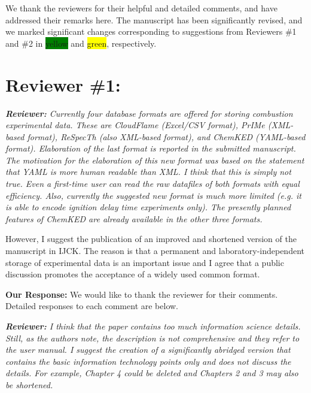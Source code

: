 \documentclass[a4paper,10pt]{elsarticle}
\providecommand{\hly}[1]{\colorbox{yellow}{#1}}
\providecommand{\hlg}[1]{\colorbox{green}{#1}}
\newenvironment{reviewer}{\vspace{0.5\baselineskip}\begingroup\itshape\textbf{Reviewer:}}{\endgroup}
\newenvironment{response}{\textbf{Our Response:}}{\vspace{0.5\baselineskip}}
\begin{document}
We thank the reviewers for their helpful and detailed comments, and have addressed their remarks here.
The manuscript has been significantly revised, and we marked significant changes corresponding to suggestions from Reviewers \#1 and \#2 in \hlg{yellow} and \hly{green}, respectively.


\section*{Reviewer \#1:}

\begin{reviewer}
    Currently four database formats are offered for storing combustion experimental data. These are
    CloudFlame (Excel/CSV format), PrIMe (XML-based format), ReSpecTh (also XML-based format), and
    ChemKED (YAML-based format). Elaboration of the last format is reported in the submitted
    manuscript. The motivation for the elaboration of this new format was based on the statement
    that YAML is more human readable than XML. I think that this is simply not true. Even a
    first-time user can read the raw datafiles of both formats with equal efficiency. Also,
    currently the suggested new format is much more limited (e.g. it is able to encode ignition
    delay time experiments only). The presently planned features of ChemKED are already available in
    the other three formats.

    However, I suggest the publication of an improved and shortened version of the manuscript in
    IJCK. The reason is that a permanent and laboratory-independent storage of experimental data is
    an important issue and I agree that a public discussion promotes the acceptance of a widely used
    common format.
\end{reviewer}

\begin{response}
    We would like to thank the reviewer for their comments. Detailed responses to each comment are
    below.
\end{response}

\begin{reviewer}
    I think that the paper contains too much information science details. Still, as the authors
    note, the description is not comprehensive and they refer to the user manual. I suggest the
    creation of a significantly abridged version that contains the basic information technology
    points only and does not discuss the details. For example, Chapter 4 could be deleted and
    Chapters 2 and 3 may also be shortened.
\end{reviewer}
\end{document}
